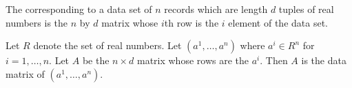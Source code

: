 
\sbasic



















\sstart
{}



The 
corresponding to a data
set of $n$
records which are length $d$ tuples
of real numbers
is the $n$ by $d$ matrix
whose $i$th row is the $i$
element of the data set.


Let $R$ denote the set
of real numbers.
Let $(a^1, \dots, a^n)$
where $a^i \in R^n$ for
$i = 1, \dots, n$.
Let $A$ be the $n \times d$
matrix whose rows are
the $a^i$.
Then $A$ is the data matrix of
 $(a^1, \dots, a^n)$.

\strats
